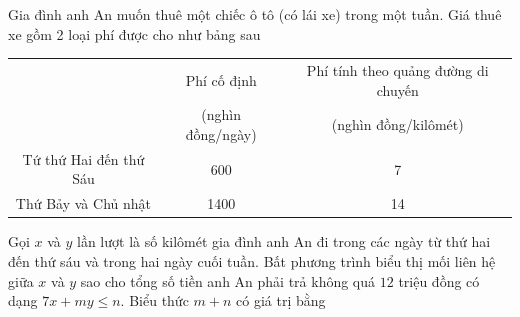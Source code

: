 \begin{ex}%
	Gia đình anh An muốn thuê một chiếc ô tô (có lái xe) trong một tuần. Giá thuê xe gồm 2 loại phí được cho như bảng sau
	\begin{center}
		\begin{tabular}{|c|c|c|}
			\hline
			& Phí cố định
			& Phí tính theo quảng đường
			di chuyến\\
			& (nghìn đồng/ngày)
			& (nghìn đồng/kilômét)\\
			\hline
			Tứ thứ Hai đến thứ Sáu & 600 & 7 \\
			\hline
			Thứ Bảy và Chủ nhật & 1400 & 14 \\
			\hline
		\end{tabular}
	\end{center}
	Gọi $x$ và $y$ lần lượt là số kilômét gia đình anh An đi trong các ngày từ thứ hai đến thứ sáu và trong hai ngày cuối tuần. Bất phương trình biểu thị mối liên hệ giữa $x$ và $y$ sao cho tổng số tiền anh An phải trả không quá $12$ triệu đồng có dạng $7x+my\le n$. Biểu thức $m+n$ có giá trị bằng
\end{ex}
